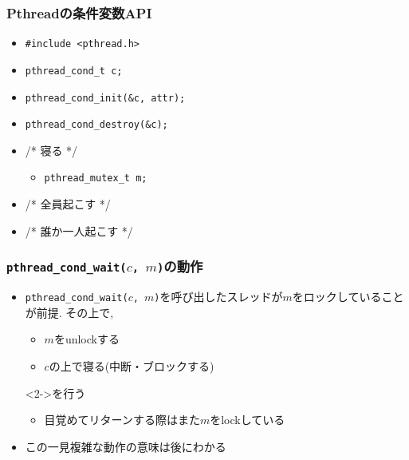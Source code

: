 \documentclass[12pt,dvipdfmx]{beamer}
\begin{document}
\begin{frame}
  \frametitle{Pthreadの条件変数API}
  \begin{itemize}
  \item {\tt \#include <pthread.h>}
  \item {\tt pthread\_cond\_t c;}
  \item {\tt pthread\_cond\_init(\&c, attr);}
  \item {\tt pthread\_cond\_destroy(\&c);}
  \item {} /* 寝る */
    \begin{itemize}
    \item {\tt pthread\_mutex\_t m;}
    \end{itemize}
  \item {} /* 全員起こす */
  \item {}    /* 誰か一人起こす */
  \end{itemize}
\end{frame}

\begin{frame}
  \frametitle{{\tt pthread\_cond\_wait($c$, $m$)}の動作}
  \begin{itemize}
  \item {\tt pthread\_cond\_wait($c$, $m$)}を呼び出したスレッドが$m$をロックしていることが前提. その上で, 
    \begin{itemize}
    \item<2-> $m$をunlockする
    \item<2-> $c$の上で寝る(中断・ブロックする)
    \end{itemize}
  \item [] <2->{を行う}
    \begin{itemize}
    \item<3-> 目覚めてリターンする際はまた$m$をlockしている
    \end{itemize}
\begin{center}
%
%
%
\end{center}
  \item<4-> この一見複雑な動作の意味は後にわかる
  \end{itemize}
\end{frame}
\end{document}
